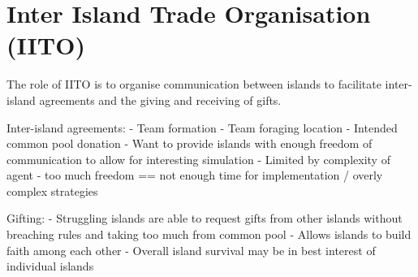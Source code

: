 \chapter{Inter Island Trade Organisation (IITO)}

The role of IITO is to organise communication between islands to facilitate inter-island agreements and the giving and receiving of gifts.  

Inter-island agreements:
    - Team formation
    - Team foraging location
    - Intended common pool donation
    - Want to provide islands with enough freedom of communication to allow for interesting simulation
    - Limited by complexity of agent - too much freedom == not enough time for implementation / overly complex strategies 

Gifting:
    - Struggling islands are able to request gifts from other islands without breaching rules and taking too much from common pool
    - Allows islands to build faith among each other 
    - Overall island survival may be in best interest of individual islands
